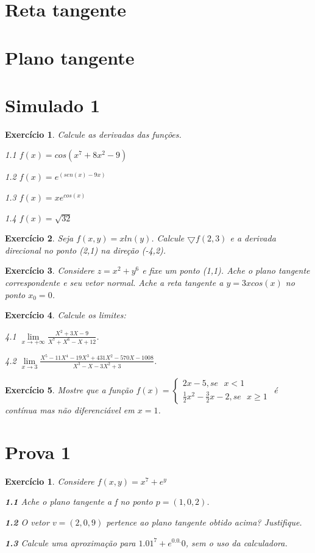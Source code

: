 \documentclass{book}
\numberwithin{defn}{chapter}
\numberwithin{exe}{chapter}
\numberwithin{ex}{chapter}
\numberwithin{obs}{chapter}
\numberwithin{fato}{chapter}
\numberwithin{resp}{chapter}
\newtheorem{exp1}{Exercício}
\newtheorem{exs1}{Exercício}
\begin{document}
\section{Reta tangente} 

\section{Plano tangente} 


\section{Simulado 1}
\begin{exs1} Calcule as derivadas das funções.
\item 1.1 $f(x)=cos(x^7+8x^2-9)$
\item 1.2 $f(x)=e^{(sen(x)-9x)}$
\item 1.3 $f(x)=xe^{cos(x)}$
\item 1.4 $f(x)=\sqrt{32}$
\end{exs1}

\begin{exs1} Seja $f(x,y)=xln(y)$. Calcule $\bigtriangledown	f(2,3)$ e a derivada direcional no ponto (2,1) na direção (-4,2).
\end{exs1}

\begin{exs1} Considere $z=x^2+y^6$ e fixe um ponto (1,1). Ache o plano tangente correspondente e seu vetor normal. Ache a reta tangente a $y=3xcos(x)$ no ponto $x_0=0$.
\end{exs1}

\begin{exs1} Calcule os limites:
\item 4.1 $\lim\limits_{x\to +\infty}\frac{X^2+3X-9}{X^7+X^6-X+12}$.
\item 4.2 $\lim\limits_{x\to 3}\frac{X^5-11X^4-19X^3+431X^2-570X-1008}{X^3-X-3X^2+3}$.
\end{exs1}

\begin{exs1} Mostre que a função $f(x)=\begin{cases} 2x-5, se \text{ }x<1\\ \frac{1}{2}x^2-\frac{3}{2}x-2, se \text{ }x \ge 1 \end{cases}$ é contínua mas não diferenciável em $x=1$.
\end{exs1}

\section{Prova 1}
\begin{exp1} Considere $f(x,y)=x^7+e^y$
\item\textbf{1.1} Ache o plano tangente a f no ponto $p=(1,0,2)$.
\item\textbf{1.2} O vetor $v=(2,0,9)$ pertence ao plano tangente obtido acima? Justifique.
\item\textbf{1.3} Calcule uma aproximação para $1.01^7+e^{0.0.}0$, sem o uso da calculadora.
\end{exp1}
\end{document}
